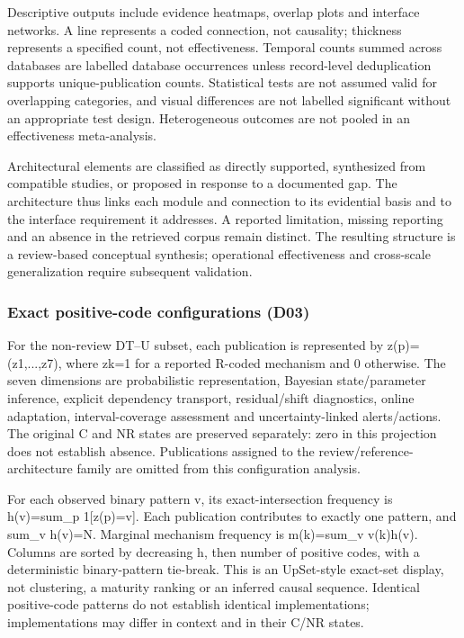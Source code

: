 Descriptive outputs include evidence heatmaps, overlap plots and interface networks. A line represents a coded connection, not causality; thickness represents a specified count, not effectiveness. Temporal counts summed across databases are labelled database occurrences unless record-level deduplication supports unique-publication counts. Statistical tests are not assumed valid for overlapping categories, and visual differences are not labelled significant without an appropriate test design. Heterogeneous outcomes are not pooled in an effectiveness meta-analysis.

Architectural elements are classified as directly supported, synthesized from compatible studies, or proposed in response to a documented gap. The architecture thus links each module and connection to its evidential basis and to the interface requirement it addresses. A reported limitation, missing reporting and an absence in the retrieved corpus remain distinct. The resulting structure is a review-based conceptual synthesis; operational effectiveness and cross-scale generalization require subsequent validation.


\subsubsection{Exact positive-code configurations (D03)}
For the non-review DT–U subset, each publication is represented by z(p)=(z1,...,z7), where zk=1 for a reported R-coded mechanism and 0 otherwise. The seven dimensions are probabilistic representation, Bayesian state/parameter inference, explicit dependency transport, residual/shift diagnostics, online adaptation, interval-coverage assessment and uncertainty-linked alerts/actions. The original C and NR states are preserved separately: zero in this projection does not establish absence. Publications assigned to the review/reference-architecture family are omitted from this configuration analysis.

For each observed binary pattern v, its exact-intersection frequency is h(v)=sum\_p 1[z(p)=v]. Each publication contributes to exactly one pattern, and sum\_v h(v)=N. Marginal mechanism frequency is m(k)=sum\_v v(k)h(v). Columns are sorted by decreasing h, then number of positive codes, with a deterministic binary-pattern tie-break. This is an UpSet-style exact-set display, not clustering, a maturity ranking or an inferred causal sequence. Identical positive-code patterns do not establish identical implementations; implementations may differ in context and in their C/NR states.


